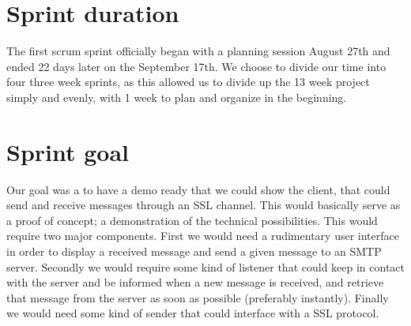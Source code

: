 \section{Sprint duration}
The first scrum sprint officially began with a planning session August 27th and ended 22 days later on the September 17th. We choose to divide our time into four three week sprints, as this allowed us to divide up the 13 week project simply and evenly, with 1 week to plan and organize in the beginning.

\section{Sprint goal}
Our goal was a to have a demo ready that we could show the client, that could send and receive messages through an SSL channel. This would basically serve as a proof of concept; a demonstration of the technical possibilities. This would require two major components. First we would need a rudimentary user interface in order to display a received message and send a given message to an SMTP server. Secondly we would require some kind of listener that could keep in contact with the server and be informed when a new message is received, and retrieve that message from the server as soon as possible (preferably instantly). Finally we would need some kind of sender that could interface with a SSL protocol.
